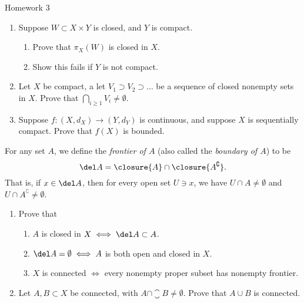\documentclass[12pt,letterpaper]{article}
\begin{document}
\pagestyle{fancy}
\begin{center}
{\Large Homework 3}%
\end{center}

\begin{enumerate}
\item Suppose $W\subset X\times Y$ is closed, and $Y$ is compact. 
	\begin{enumerate}[label=(\roman*)]
	\item Prove that $\pi_X(W)$ is closed in $X$. 
	\item Show this fails if $Y$ is not compact. 
	\end{enumerate}
	
\item Let $X$ be compact, a let $V_1\supset V_2\supset \dots$ be a sequence of closed nonempty sets in $X$. Prove that $\bigcap\limits_{i\geq 1} V_i \neq \emptyset$. 

\item Suppose $f:(X,d_X)\to (Y,d_Y)$ is continuous, and suppose $X$ is sequentially compact. Prove that $f(X)$ is bounded. 

\end{enumerate}

\begin{definition*}
For any set $A$, we define the \emph{frontier of $A$} (also called the \emph{boundary of $A$}) to be 
$$\del A=\closure{A}\cap\closure{A^\complement}.$$
That is, if $x\in\del A$, then for every open set $U\ni x$, we have $U\cap A\neq\emptyset$ and $U\cap A^\complement\neq\emptyset$. 
\end{definition*}

\begin{enumerate}[resume]
\item Prove that 
	\begin{enumerate}[label=(\roman*)]
	\item $A$ is closed in $X \iff \del A\subset A$. 
	\item $\del A = \emptyset \iff A$ is both open and closed in $X$.
	\item $X$ is connected $\iff$ every nonempty proper subset has nonempty frontier. 
	\end{enumerate}
	
\item Let $A,B\subset X$ be connected, with $A\cap \closure{B}\neq\emptyset$. Prove that $A\cup B$ is connected. 
\end{enumerate}
\end{document}
